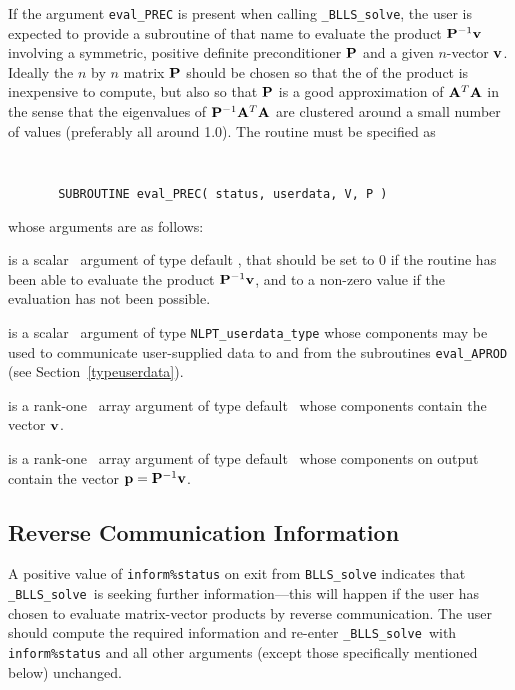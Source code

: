 \documentclass{galahad}
\newcommand{\packagename}{BLLS}
\newcommand{\fullpackagename}{\libraryname\_\packagename}
\newcommand{\solver}{{\tt \fullpackagename\_solve}}
\begin{document}
If the argument {\tt eval\_PREC} is present when calling \solver, the
user is expected to provide a subroutine of that name to evaluate the
product ${\mathbf{P}}^{-1} {\mathbf{v}}$ involving a symmetric, positive definite
preconditioner ${\mathbf{P}}$ and a given $n$-vector ${\mathbf{v}}$.
Ideally the $n$ by $n$ matrix ${\mathbf{P}}$ should be chosen so that the
of the product is inexpensive to compute, but also so that ${\mathbf{P}}$ is
a good approximation of ${\mathbf{A}}^T {\mathbf{A}}$ in the sense that the eigenvalues
of ${\mathbf{P}}^{-1} {\mathbf{A}}^T {\mathbf{A}}$ are clustered around a small number of values
(preferably all around 1.0). The routine must be specified as

\def\baselinestretch{0.8}
{\tt
\begin{verbatim}
       SUBROUTINE eval_PREC( status, userdata, V, P )
\end{verbatim} }
\def\baselinestretch{1.0}
\noindent whose arguments are as follows:

\begin{description}
 is a scalar \intentout\ argument of type default \integer,
that should be set to 0 if the routine has been able to evaluate the
product ${\mathbf{P}}^{-1} {\mathbf{v}}$,
and to a non-zero value if the evaluation has not been possible.

 is a scalar \intentinout\ argument of type
{\tt NLPT\_userdata\_type} whose components may be used
to communicate user-supplied data to and from the subroutines
{\tt eval\_APROD}
(see Section~\ref{typeuserdata}).

 is a rank-one \intentin\ array argument of type default \realdp\
whose components contain the vector ${\mathbf{v}}$.

 is a rank-one \intentinout\ array argument of type default \realdp\
whose components on output contain the vector ${\mathbf{p}} = {\mathbf{P}}^{-1} {\mathbf{v}}$.

\end{description}



\subsection{\label{reverse}Reverse Communication Information}

A positive value of {\tt inform\%status} on exit from
{\tt \packagename\_solve}
indicates that
\solver\ is seeking further information---this will happen
if the user has chosen to evaluate matrix-vector products by
reverse communication.
The user should compute the required information and re-enter \solver\
with {\tt inform\%status} and all other arguments (except those specifically
mentioned below) unchanged.
\end{document}
